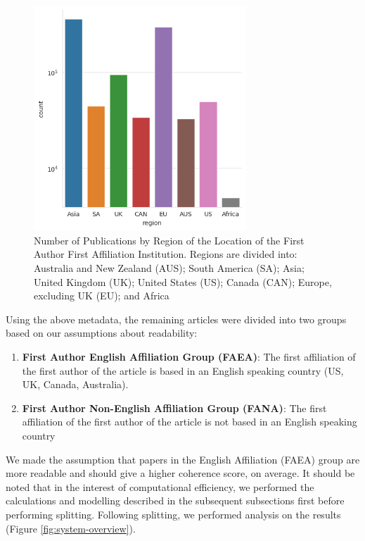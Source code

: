 \documentclass[11pt,a4paper]{article}
\begin{document}
\begin{figure}
    \centering
    \includegraphics[width=8cm]{images/pmc.country.histogram.png}
    \caption{Number of Publications by Region of the Location of the First Author First Affiliation Institution. Regions are divided into: Australia and New Zealand (AUS); South America (SA); Asia; United Kingdom (UK); United States (US); Canada (CAN); Europe, excluding UK (EU); and Africa}
    \label{fig:pmc-by-region}
\end{figure}

Using the above metadata, the remaining articles were divided into two groups based on our assumptions about readability:
\begin{enumerate}
\item \textbf{First Author English Affiliation Group (FAEA)}: The first affiliation of the first author of the article is based in an English speaking country (US, UK, Canada, Australia).
\item \textbf{First Author Non-English Affiliation Group (FANA)}: The first affiliation of the first author of the article is not based in an English speaking country
\end{enumerate}

We made the assumption that papers in the English Affiliation (FAEA) group are more readable and should give a higher coherence score, on average. It should be noted that in the interest of computational efficiency, we performed the calculations and modelling described in the subsequent subsections first before performing splitting. Following splitting, we performed analysis on the results (Figure \ref{fig:system-overview}).
\end{document}
